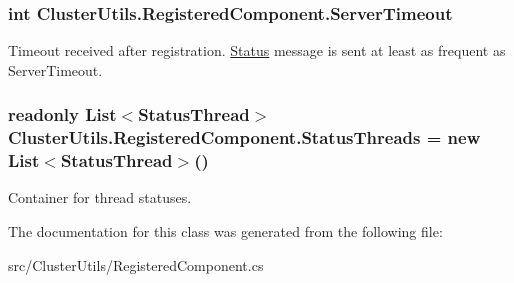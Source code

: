 \subsubsection[{Server\+Timeout}]{\setlength{\rightskip}{0pt plus 5cm}int Cluster\+Utils.\+Registered\+Component.\+Server\+Timeout\hspace{0.3cm}{\ttfamily [protected]}}\label{class_cluster_utils_1_1_registered_component_ac95b4af9a774f273a235e31215d6e7bc}


Timeout received after registration. \hyperlink{class_status}{Status} message is sent at least as frequent as Server\+Timeout. 

\hypertarget{class_cluster_utils_1_1_registered_component_a19bb76d070f24ca944bab753b1409b03}{}
\subsubsection[{Status\+Threads}]{\setlength{\rightskip}{0pt plus 5cm}readonly List$<${\bf Status\+Thread}$>$ Cluster\+Utils.\+Registered\+Component.\+Status\+Threads = new List$<${\bf Status\+Thread}$>$()\hspace{0.3cm}{\ttfamily [protected]}}\label{class_cluster_utils_1_1_registered_component_a19bb76d070f24ca944bab753b1409b03}


Container for thread statuses. 



The documentation for this class was generated from the following file\+:\begin{DoxyCompactItemize}
\item 
src/\+Cluster\+Utils/Registered\+Component.\+cs\end{DoxyCompactItemize}
